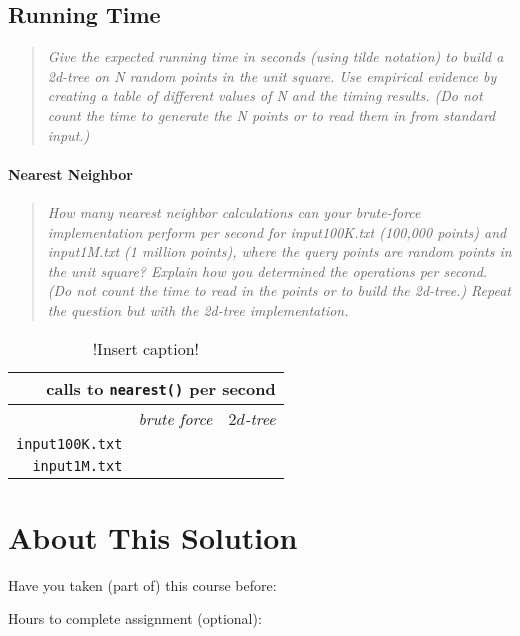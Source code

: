 \documentclass[11pt,a4paper,notitlepage]{article}
\newcommand{\explanation}[1]{\begin{quote}\emph{#1} \end{quote}}  %
\begin{document}
\subsection*{Running Time}
\explanation{
   Give the expected running time in seconds (using tilde notation)
   to build a 2d-tree on N random points in the unit square.
   Use empirical evidence by creating a table of different values of N
   and the timing results. (Do not count the time to generate the N 
   points or to read them in from standard input.)
}

\paragraph*{Nearest Neighbor}
\explanation{
   How many nearest neighbor calculations can your brute-force
   implementation perform per second for input100K.txt (100,000 points)
   and input1M.txt (1 million points), where the query points are
   random points in the unit square? Explain how you determined the
   operations per second. (Do not count the time to read in the points
   or to build the 2d-tree.)
% 
   Repeat the question but with the 2d-tree implementation.}


\begin{table}[htbp]
\renewcommand{\arraystretch}{2}
  \centering
  \caption{!Insert caption!}
        \label{tab:table1}
        \begin{tabular}{|r| c | c |}
          \multicolumn{3}{r}{calls to \texttt{nearest()} per second} \\
        \hline
         & \qquad \emph{brute force} \qquad & \qquad \emph{$2d$-tree} \qquad \\
        \hline
        \texttt{input100K.txt} & & \\\hline
        \texttt{input1M.txt} & & \\
        \hline
        \end{tabular}
\end{table}



\section{About This Solution}

Have you taken (part of) this course before:
\smallskip

Hours to complete assignment (optional):


 
\end{document}
